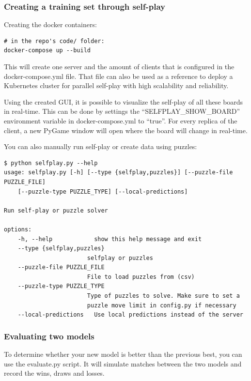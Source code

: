 \documentclass{article}
\begin{document}
\subsubsection{Creating a training set through self-play}

Creating the docker containers:

\begin{verbatim}
# in the repo's code/ folder:
docker-compose up --build
\end{verbatim}

This will create one server and the amount of clients that is configured in the docker-compose.yml file.
That file can also be used as a reference to deploy a Kubernetes cluster for parallel self-play with 
high scalability and reliability. 

Using the created GUI, it is possible to visualize the self-play of all these boards in real-time.
This can be done by settings the ``SELFPLAY\_SHOW\_BOARD'' environment variable in docker-compose.yml to ``true''.
For every replica of the client, a new PyGame window will open where the board will change in real-time. 

You can also manually run self-play or create data using puzzles:

\begin{verbatim}
$ python selfplay.py --help
usage: selfplay.py [-h] [--type {selfplay,puzzles}] [--puzzle-file PUZZLE_FILE] 
    [--puzzle-type PUZZLE_TYPE] [--local-predictions]

Run self-play or puzzle solver

options:
    -h, --help            show this help message and exit
    --type {selfplay,puzzles}
                        selfplay or puzzles
    --puzzle-file PUZZLE_FILE
                        File to load puzzles from (csv)
    --puzzle-type PUZZLE_TYPE
                        Type of puzzles to solve. Make sure to set a 
                        puzzle move limit in config.py if necessary
    --local-predictions   Use local predictions instead of the server
\end{verbatim}

\subsubsection{Evaluating two models}

To determine whether your new model is better than the previous best, you can use the evaluate.py script.
It will simulate matches between the two models and record the wins, draws and losses.
\end{document}
